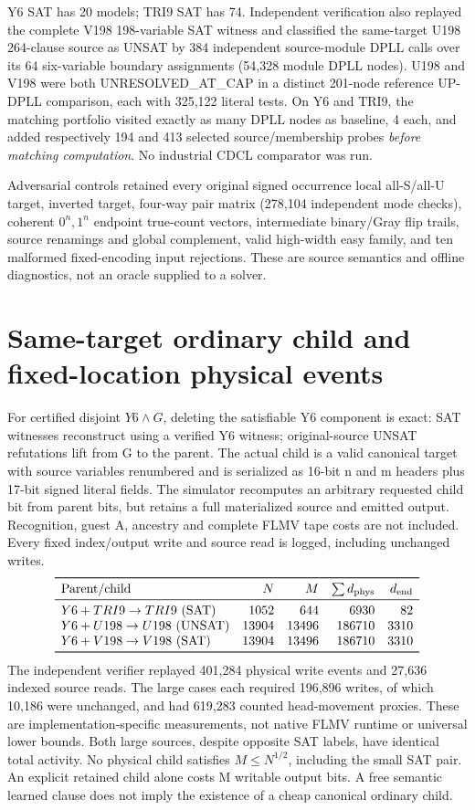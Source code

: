 \documentclass[10pt]{article}
\begin{document}
Y6 SAT has 20 models; TRI9 SAT has 74. Independent verification also
replayed the complete V198 198-variable SAT witness and classified
the same-target U198 264-clause source as UNSAT by 384 independent
source-module DPLL calls over its 64 six-variable boundary assignments
(54,328 module DPLL nodes). U198 and V198 were both
UNRESOLVED\_AT\_CAP in a distinct 201-node reference UP-DPLL
comparison, each with 325,122 literal tests.
On Y6 and TRI9, the matching portfolio visited exactly as many
DPLL nodes as baseline, 4 each, and added respectively 194 and 413
selected source/membership probes \emph{before matching computation}.
No industrial CDCL comparator was run.

Adversarial controls retained every original signed occurrence local
all-S/all-U target, inverted target, four-way pair matrix
(278,104 independent mode checks), coherent $0^n,1^n$ endpoint
true-count vectors, intermediate binary/Gray flip trails, source
renamings and global complement, valid high-width easy family, and
ten malformed fixed-encoding input rejections. These are source
semantics and offline diagnostics, not an oracle supplied to a solver.

\section*{Same-target ordinary child and fixed-location physical events}
For certified disjoint $Y6\land G$, deleting the satisfiable Y6
component is exact: SAT witnesses reconstruct using a verified Y6
witness; original-source UNSAT refutations lift from G to the parent.
The actual child is a valid canonical target with source variables
renumbered and is serialized as 16-bit n and m headers plus 17-bit
signed literal fields. The simulator recomputes an arbitrary requested
child bit from parent bits, but retains a full materialized source and
emitted output. Recognition, guest A, ancestry and complete FLMV tape
costs are not included. Every fixed index/output write and source read
is logged, including unchanged writes.
\[
\begin{array}{lrrrr}
\toprule
\text{Parent/child} & N&M&\sum d_{\rm phys}&d_{\rm end}\\\midrule
Y6+TRI9\to TRI9\ ({\rm SAT})&1052&644&6930&82\\
Y6+U198\to U198\ ({\rm UNSAT})&13904&13496&186710&3310\\
Y6+V198\to V198\ ({\rm SAT})&13904&13496&186710&3310\\
\bottomrule
\end{array}
\]
The independent verifier replayed 401,284 physical write events
and 27,636 indexed source reads. The large cases each required 196,896
writes, of which 10,186 were unchanged, and had 619,283 counted
head-movement proxies. These are implementation-specific measurements,
not native FLMV runtime or universal lower bounds. Both large sources,
despite opposite SAT labels, have identical total activity. No
physical child satisfies $M\le N^{1/2}$, including the small SAT pair.
An explicit retained child alone costs M writable output bits.
A free semantic learned clause does not imply the existence of
a cheap canonical ordinary child.
\end{document}

